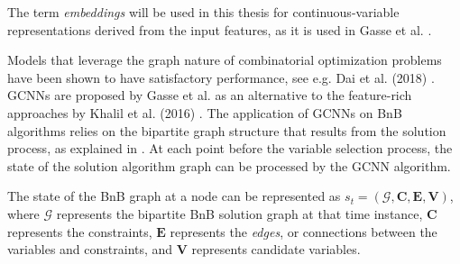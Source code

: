 The term \textit{embeddings} will be used in this thesis for continuous-variable representations derived from the input features, as it is used in Gasse et al. \cite{gasse2019exact}. 

Models that leverage the graph nature of combinatorial optimization problems have been shown to have satisfactory performance, see e.g. Dai et al. (2018) \cite{dai2018learning}. 
\gls{GCNN}s are proposed by Gasse et al. \cite{gasse2019exact} as an alternative to the feature-rich approaches by Khalil et al. (2016) \cite{khalil2016learning}. 
The application of \gls{GCNN}s on \gls{BnB} algorithms relies on the bipartite graph structure that results from the solution process, as explained in . At each point before the variable selection process, the state of the solution algorithm graph can be processed by the \gls{GCNN} algorithm. 

The state of the \gls{BnB} graph at a node can be represented as $s_t = (\mathcal{G}, \mathbf{C}, \mathbf{E}, \mathbf{V})$, where $\mathcal{G}$ represents the bipartite \gls{BnB} solution graph at that time instance, $\mathbf{C}$ represents the constraints, $\mathbf{E}$ represents the \textit{edges}, or connections between the variables and constraints, and $\mathbf{V}$ represents candidate variables.  